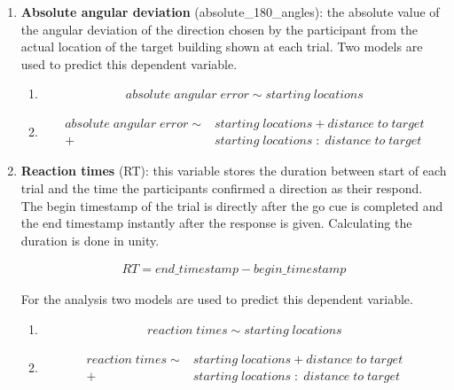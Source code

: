 \begin{enumerate}
	\item \textbf{Absolute angular deviation} {\emphasize (absolute\_180\_angles)}: the absolute value of the angular deviation of the direction chosen by the participant from the actual location of the target building shown at each trial. Two models are used to predict this dependent variable. \\
	
	\begin{enumerate}
		\item
		\begin{align*}
			absolute \; angular \; error \sim starting \; locations
		\end{align*}
	
		\item 
		\begin{align*}
			absolute \; angular \; error \sim &starting \; locations + distance \; to \; target \\
			+ &starting \; locations \; : \; distance \; to \; target
		\end{align*}
	\end{enumerate}
	

	\item \textbf{Reaction times} {\emphasize (RT)}: this variable stores the duration between start of each trial and the time the participants confirmed a direction as their respond. The begin timestamp of the trial is directly after the go cue is completed and the end timestamp instantly after the response is given. Calculating the duration is done in unity. 
	
	\begin{align*}
		RT = end\_timestamp - begin\_timestamp
	\end{align*}

	 For the analysis two models are used to predict this dependent variable.\\
	 
	 
	 \begin{enumerate}
	 	\item
	 	\begin{align*}
	 		reaction \; times \sim starting \; locations
	 	\end{align*}
	 	
	 	\item 
	 	\begin{align*}
	 		reaction \; times \sim &starting \; locations + distance \; to \; target \\
	 		+ &starting \; locations \; : \; distance \; to \; target
	 	\end{align*}
	 \end{enumerate}
 
\end{enumerate}






